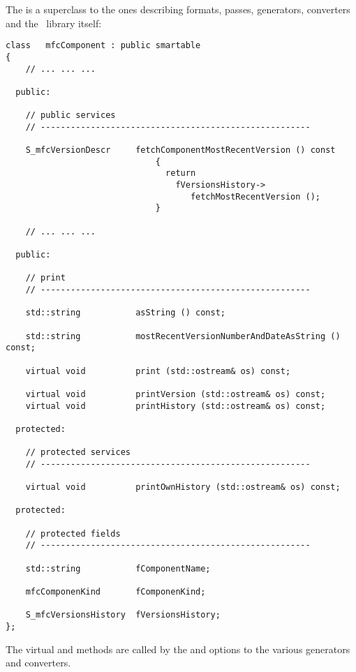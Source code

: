 The  is a superclass  to the ones describing formats, passes, generators, converters and the \mf\ library itself:
\begin{lstlisting}[language=CPlusPlus]
class   mfcComponent : public smartable
{
	// ... ... ...

  public:

    // public services
    // ------------------------------------------------------

    S_mfcVersionDescr     fetchComponentMostRecentVersion () const
                              {
                                return
                                  fVersionsHistory->
                                     fetchMostRecentVersion ();
                              }

	// ... ... ...

  public:

    // print
    // ------------------------------------------------------

    std::string           asString () const;

    std::string           mostRecentVersionNumberAndDateAsString () const;

    virtual void          print (std::ostream& os) const;

    virtual void          printVersion (std::ostream& os) const;
    virtual void          printHistory (std::ostream& os) const;

  protected:

    // protected services
    // ------------------------------------------------------

    virtual void          printOwnHistory (std::ostream& os) const;

  protected:

    // protected fields
    // ------------------------------------------------------

    std::string           fComponentName;

    mfcComponenKind       fComponenKind;

    S_mfcVersionsHistory  fVersionsHistory;
};
\end{lstlisting}

The virtual  and  methods are called by the  and  options to the various generators and converters.


